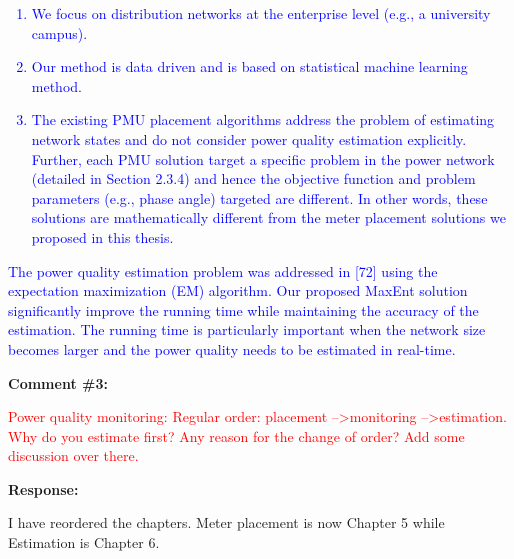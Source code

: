 \documentclass[journal]{IEEEtran}
\begin{document}
\vspace{-1em}
\begin{adjustwidth}{3.5em}{0pt}
\noindent\textcolor{blue}{
\begin{enumerate}
\item We focus on distribution networks at the enterprise level (e.g., a university
campus).
\item Our method is data driven and is based on statistical machine learning method.
\item The existing PMU placement algorithms address the problem of estimating network states and do not consider power quality estimation explicitly. Further, each PMU solution target a specific problem in the power network (detailed in Section 2.3.4) and hence the objective function and problem parameters (e.g., phase angle) targeted are different. In other words, these solutions are mathematically different from the meter placement solutions we proposed in this thesis.
\end{enumerate}
}
\end{adjustwidth}

\begin{adjustwidth}{2.5em}{0pt}
\noindent\textcolor{blue}{The power quality estimation problem was addressed in [72] using the expectation maximization (EM) algorithm. Our proposed MaxEnt solution significantly improve the running time while maintaining the accuracy of the estimation. The running time is particularly important when the network size becomes larger and the power quality needs to be estimated in real-time.}
\end{adjustwidth}

\vspace{30pt}
\textbf{Comment \#3:}
\begin{adjustwidth}{2.5em}{0pt}
\singlespacing \vspace{-10pt}
\textcolor{red}{Power quality monitoring: Regular order: placement --\textgreater monitoring --\textgreater estimation. Why do you estimate first? Any reason for the change of order? Add some discussion over there.}
\end{adjustwidth}

\vspace{10pt}
\textbf{Response:}
\begin{adjustwidth}{2.5em}{0pt}
I have reordered the chapters. Meter placement is now Chapter 5 while Estimation is Chapter 6.
\end{adjustwidth}
\end{document}
